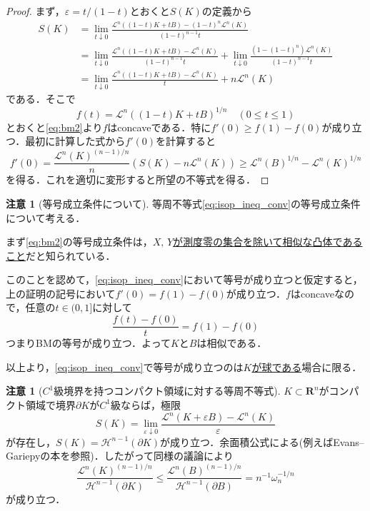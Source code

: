 \documentclass[a4j]{ltjsarticle}
\newcommand{\Rset}{\mathbf{R}}
\newcommand{\Lm}{\mathcal{L}}
\newcommand{\Hm}{\mathcal{H}}
\newcommand{\1}{\bm{1}}
\numberwithin{equation}{section}
\theoremstyle{definition}
\newtheorem{rmk}[thm]{注意}
\begin{document}
\begin{proof}
    まず，$\varepsilon=t/(1-t)$とおくと$S(K)$の定義から
    \begin{align}
        S(K)&=\lim_{t\downarrow0}\frac{\Lm^n((1-t)K+tB)-(1-t)^n\Lm^n(K)}{(1-t)^{n-1}t}\\
        &=\lim_{t\downarrow0}\frac{\Lm^n((1-t)K+tB)-\Lm^n(K)}{(1-t)^{n-1}t}+\lim_{t\downarrow0}\frac{(1-(1-t)^n)\Lm^n(K)}{(1-t)^{n-1}t}\\
        &=\lim_{t\downarrow 0}\frac{\Lm^n((1-t)K+tB)-\Lm^n(K)}{t}+n\Lm^n(K)
    \end{align}
    である．そこで
    \begin{equation}
        f(t)=\Lm^n((1-t)K+tB)^{1/n}\quad (0\leq t\leq 1)
    \end{equation}
    とおくと\eqref{eq:bm2}より$f$はconcaveである．特に$f'(0)\geq f(1)-f(0)$が成り立つ．最初に計算した式から$f'(0)$を計算すると
    \begin{equation}
        f'(0)=\frac{\Lm^n(K)^{(n-1)/n}}{n}(S(K)-n\Lm^n(K))\geq \Lm^n(B)^{1/n}-\Lm^n(K)^{1/n}
    \end{equation}
    を得る．これを適切に変形すると所望の不等式を得る．
\end{proof}
\begin{rmk}[等号成立条件について]
    等周不等式\eqref{eq:isop_ineq_conv}の等号成立条件について考える．
    
    まず\eqref{eq:bm2}の等号成立条件は，\underline{$X,\,Y$が測度零の集合を除いて相似な凸体であること}だと知られている．

    このことを認めて，\eqref{eq:isop_ineq_conv}において等号が成り立つと仮定すると，上の証明の記号において$f'(0)=f(1)-f(0)$が成り立つ．$f$はconcaveなので，任意の$t\in(0,1]$に対して
    \begin{equation}
        \frac{f(t)-f(0)}{t}=f(1)-f(0)
    \end{equation}
    つまりBMの等号が成り立つ．よって$K$と$B$は相似である．

    以上より，\eqref{eq:isop_ineq_conv}で等号が成り立つのは\underline{$K$が球である}場合に限る．
\end{rmk}
\begin{rmk}[$C^1$級境界を持つコンパクト領域に対する等周不等式]
    $K\subset \Rset^n$がコンパクト領域で境界$\partial K$が$C^1$級ならば，極限
    \begin{equation}
        S(K)=\lim_{\varepsilon\downarrow0}\frac{\Lm^n(K+\varepsilon B)-\Lm^n(K)}{\varepsilon}
    \end{equation}
    が存在し，$S(K)=\Hm^{n-1}(\partial K)$が成り立つ．余面積公式による(例えばEvans--Gariepyの本\cite{EG}を参照)．したがって同様の議論により
    \begin{equation}
        \frac{\Lm^n(K)^{(n-1)/n}}{\Hm^{n-1}(\partial K)}\leq \frac{\Lm^n(B)^{(n-1)/n}}{\Hm^{n-1}(\partial B)}=n^{-1}\omega_n^{-1/n}\label{eq:isop_ineq_c1}\tag{IP2}
    \end{equation}
    が成り立つ．
\end{rmk}
\end{document}
